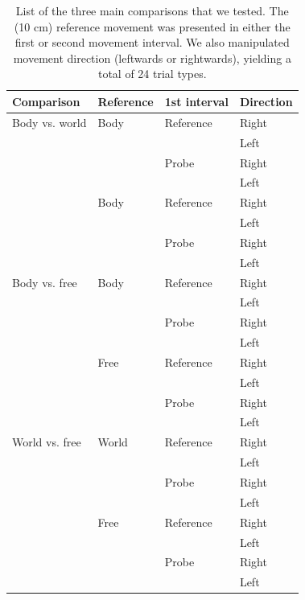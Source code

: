 \begin{table}
    \begin{tabular}{llll}
    Comparison & Reference & 1st interval & Direction \\
    \hline
    Body vs. world & Body & Reference & Right \\
    & & & Left \\    
    & & Probe & Right \\
    & & & Left \\
    \cline{2-4}
	& Body & Reference & Right \\
    & & & Left \\    
    & & Probe & Right \\
    & & & Left \\
    \hline
    Body vs. free & Body & Reference & Right \\
    & & & Left \\    
    & & Probe & Right \\
    & & & Left \\
    \cline{2-4}
	& Free & Reference & Right \\
    & & & Left \\    
    & & Probe & Right \\
    & & & Left \\
    \hline
    World vs. free & World & Reference & Right \\
    & & & Left \\    
    & & Probe & Right \\
    & & & Left \\
    \cline{2-4}
	& Free & Reference & Right \\
    & & & Left \\    
    & & Probe & Right \\
    & & & Left \\    
    \end{tabular}

    \caption{List of the three main comparisons that we tested. The (10 \si{\centi\metre}) reference movement was presented in either the first or second movement interval. We also manipulated movement direction (leftwards or rightwards), yielding a total of 24 trial types.}

    \label{p3:tab1}
\end{table}

